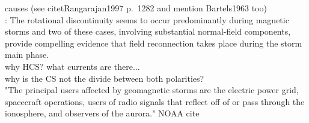 causes (see citet{Rangarajan1997} p.~1282 and mention Bartels1963 too)\\

\citet{Sonnerup1967}: The rotational discontinuity seems to occur predominantly during magnetic storms and two of these cases, involving substantial normal-field components, provide compelling evidence that field reconnection takes place during the storm main phase.\\



why HCS? what currents are there...\\
why is the CS not the divide between both polarities?\\

"The principal users affected by geomagnetic storms are the electric power grid, spacecraft operations, users of radio signals that reflect off of or pass through the ionosphere, and observers of the aurora." NOAA cite\\

